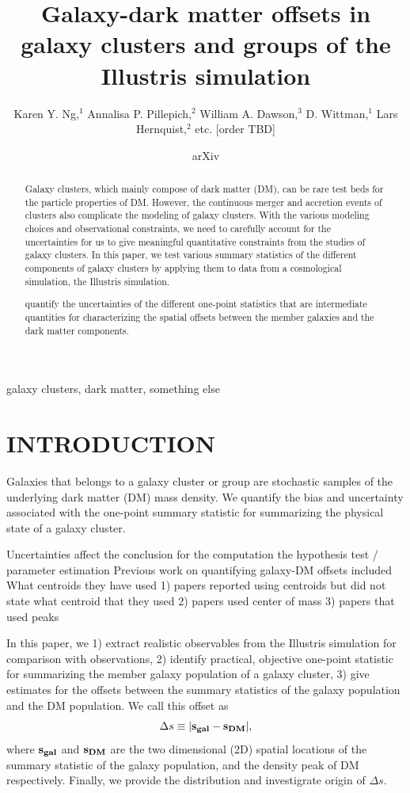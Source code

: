 \documentclass[usenatbib]{mn2e}
\title[
	Galaxy-dark matter offsets in galaxy clusters and groups of the
Illustris simulation
]
{Galaxy-dark matter offsets in galaxy clusters and groups of the
Illustris simulation}
\author[Karen Y. Ng et al.]{Karen Y. Ng,$^{1}$
	Annalisa P. Pillepich,$^{2}$ 
	William A. Dawson,$^{3}$ 
	D. Wittman,$^{1}$
	\newauthor Lars Hernquist,$^{2}$
	etc. [order TBD]
}
\begin{document}
\date{arXiv} \pagerange{\pageref{firstpage}--\pageref{lastpage}}
 \maketitle\label{firstpage}
\begin{abstract} 
	Galaxy clusters, which mainly compose of dark matter (DM), 
	can be rare test beds for the particle properties of DM.
	However, the continuous merger and accretion events of clusters also
	complicate the modeling of galaxy clusters.
	With the various modeling choices and observational constraints, 
	we need to carefully account for the
	uncertainties for us to give meaningful quantitative constraints from the studies of galaxy clusters. In this paper, we test various summary statistics of the different components
	of galaxy clusters by applying them to data from a cosmological simulation,
	the Illustris simulation.
	
	quantify the uncertainties of the different one-point statistics that
	are intermediate quantities for characterizing the spatial offsets between
	the member galaxies and the dark matter components. 

\end{abstract}
\begin{keywords}
	galaxy clusters, dark matter, something else 
\end{keywords}
\section{INTRODUCTION} 
Galaxies that belongs to a galaxy cluster or group are stochastic samples
of the underlying dark matter (DM) mass density. 
We quantify the bias and uncertainty associated with the one-point summary
statistic for summarizing the physical state of a galaxy cluster. 

Uncertainties affect the conclusion for the computation the hypothesis test / parameter
estimation
Previous work on quantifying galaxy-DM offsets included  
What centroids they have used
1) papers reported using centroids but did not state what centroid that they
used 
2) papers used center of mass 
3) papers that used peaks  

In this paper, we 
1) extract realistic observables from the Illustris simulation for
comparison with observations, 2) identify practical, objective one-point statistic for 
summarizing the member galaxy population of a galaxy cluster, 3)	
give estimates for the offsets between the summary statistics of the galaxy  
population and the DM population. We call this offset as 
\begin{equation}
	\Delta s \equiv |\bf{s}_{gal} - \bf{s}_{DM}|,
\end{equation}
where $\bf{s}_{gal}$ and $\bf{s}_{DM}$ are the two dimensional (2D) spatial
locations of the summary statistic of the galaxy population, and the density
peak of DM respectively. 
Finally, we provide the distribution and investigrate origin of $\Delta s$. 
\end{document}
